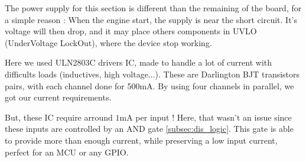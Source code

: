 The power supply for this section is different than the remaining of the board,
for a simple reason : When the engine start, the supply is near the short
circuit. It's voltage will then drop, and it may place others components in
UVLO (UnderVoltage LockOut), where the device stop working.

Here we used ULN2803C drivers IC, made to handle a lot of current with
difficults loads (inductives, high voltage...). These are Darlington BJT
transistors pairs, with each channel done for 500mA. By using four channels in
parallel, we got our current requirements.

But, these IC require arround $ 1 \si{\milli\ampere}$ per input ! Here, that
wasn't an issue since these inputs are controlled by an AND gate
\ref{subsec:dis_logic}. This gate is able to provide more than enough current,
while preserving a low input current, perfect for an MCU or any GPIO.
